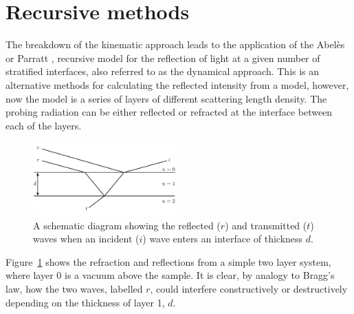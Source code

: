 \documentclass[
 reprint,
 superscriptaddress,
 amsmath,amssymb,
 aps,
]{revtex4-2}
\begin{document}
\section{Recursive methods}
The breakdown of the kinematic approach leads to the application of the Abel\`{e}s \cite{abeles_sur_1948} or Parratt \cite{parratt_surface_1954}, recursive model for the reflection of light at a given number of stratified interfaces, also referred to as the dynamical approach. 
This is an alternative methods for calculating the reflected intensity from a model, however, now the model is a series of layers of different scattering length density. 
The probing radiation can be either reflected or refracted at the interface between each of the layers. 
%
\begin{figure}[t]
    \includegraphics[width=0.49\textwidth]{refr}
    \caption{A schematic diagram showing the reflected ($r$) and transmitted ($t$) waves when an incident ($i$) wave enters an interface of thickness $d$.}
    \label{fig:refr}
\end{figure}
% 
Figure~\ref{fig:refr} shows the refraction and reflections from a simple two layer system, where layer \num{0} is a vacuum above the sample. 
It is clear, by analogy to Bragg's law, how the two waves, labelled $r$, could interfere constructively or destructively depending on the thickness of layer \num{1}, $d$.
\end{document}
